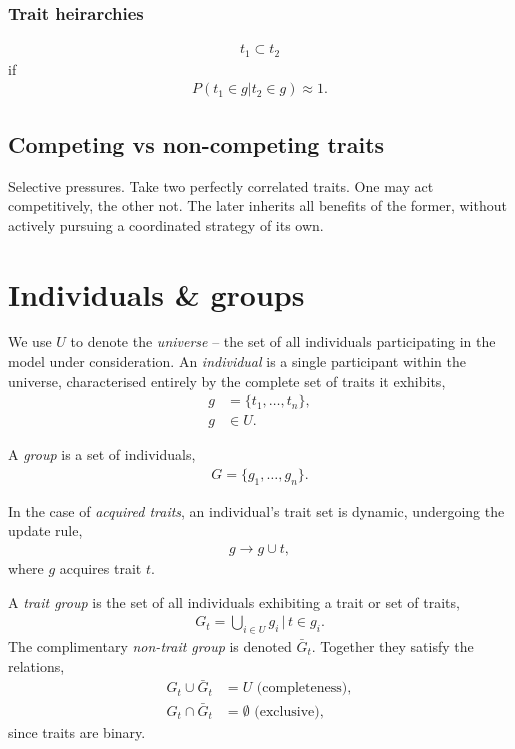 \documentclass[twocolumn, aps, rmp, amsmath, amssymb, nofootinbib, superscriptaddress, longbibliography, floatfix, table-of-contents, eqsecnum]{revtex4-1}
\begin{document}
\subsubsection{Trait heirarchies}

\begin{align}
t_1 \subset t_2	
\end{align}
if
\begin{align}
P(t_1\in g | t_2\in g)\approx 1.	
\end{align}

\subsection{Competing vs non-competing traits}

Selective pressures. Take two perfectly correlated traits. One may act competitively, the other not. The later inherits all benefits of the former, without actively pursuing a coordinated strategy of its own.

\section{Individuals \& groups}

We use $U$ to denote the \textit{universe} -- the set of all individuals participating in the model under consideration. An \textit{individual} is a single participant within the universe, characterised entirely by the complete set of traits it exhibits,
\begin{align}
	g &= \{t_1,\dots,t_n\},\nonumber\\
	g &\in U.
\end{align}

A \textit{group} is a set of individuals,
\begin{align}
	G = \{g_1,\dots,g_n\}.	
\end{align}

In the case of \textit{acquired traits}, an individual's trait set is dynamic, undergoing the update rule,
\begin{align}
	g\to g\cup t,	
\end{align}
where $g$ acquires trait $t$.

A \textit{trait group} is the set of all individuals exhibiting a trait or set of traits,
\begin{align}
	G_t = \bigcup_{i\in U} g_i \,|\, t\in g_i.
\end{align}
The complimentary \textit{non-trait group} is denoted $\bar G_t$. Together they satisfy the relations,
\begin{align}
G_t \cup \bar G_t &= U \,\,\text{(completeness)},\nonumber\\
G_t \cap \bar G_t &= \emptyset \,\,\text{(exclusive)},
\end{align}
since traits are binary.
\end{document}
